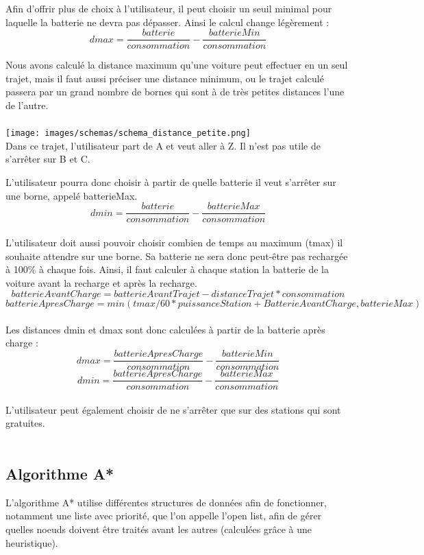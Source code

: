 \documentclass[12pt,titlepage]{report}
\begin{document}
Afin d'offrir plus de choix à l'utilisateur, il peut choisir un seuil minimal pour laquelle la batterie ne devra pas dépasser. Ainsi le calcul change légèrement :
\[dmax = \frac{batterie}{consommation} - \frac{batterieMin}{consommation}\]

Nous avons calculé la distance maximum qu'une voiture peut effectuer en un seul trajet, mais il faut aussi préciser une distance minimum, ou le trajet calculé passera par un grand nombre de bornes qui sont à de très petites distances l'une de l'autre.\\\\

\texttt{[image: images/schemas/schema\_distance\_petite.png]}\\
Dans ce trajet, l'utilisateur part de A et veut aller à Z. Il n'est pas utile de s'arrêter sur B et C.

L'utilisateur pourra donc choisir à partir de quelle batterie il veut s'arrêter sur une borne, appelé batterieMax.
\[dmin = \frac{batterie}{consommation} - \frac{batterieMax}{consommation}\]
\\
L'utilisateur doit aussi pouvoir choisir combien de temps au maximum (tmax) il souhaite attendre sur une borne. Sa batterie ne sera donc peut-être pas rechargée à 100\% à chaque fois. Ainsi, il faut calculer à chaque station la batterie de la voiture avant la recharge et après la recharge.
\\
\[batterie Avant Charge = batterie Avant Trajet - distance Trajet * consommation\]
\[batterie Apres Charge = min(tmax/60 * puissance Station + Batterie Avant Charge, batterieMax)\]
\\
Les distances dmin et dmax sont donc calculées à partir de la batterie après charge :
\[dmax = \frac{batterieApresCharge}{consommation} - \frac{batterieMin}{consommation}\]
\[dmin = \frac{batterieApresCharge}{consommation} - \frac{batterieMax}{consommation}\]
\\
L'utilisateur peut également choisir de ne s'arrêter que sur des stations qui sont gratuites.
\\\\

\subsection{Algorithme A*}

L'algorithme A* utilise différentes structures de données afin de fonctionner, notamment une liste avec priorité, que l'on appelle l'open list, afin de gérer quelles noeuds doivent être traités avant les autres (calculées grâce à une heuristique).
\end{document}
